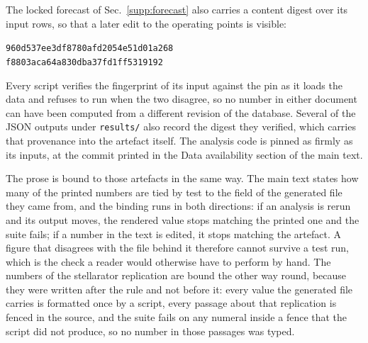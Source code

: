 \documentclass[12pt,letterpaper]{article}
\begin{document}
\noindent The locked forecast of Sec.~\ref{supp:forecast} also carries a
content digest over its input rows, so that a later edit to the operating
points is visible:
\begin{center}\scriptsize
\texttt{960d537ee3df8780afd2054e51d01a268} \\
\texttt{f8803aca64a830dba37fd1ff5319192}
\end{center}

\noindent Every script verifies the fingerprint of its input against the pin as
it loads the data and refuses to run when the two disagree, so no number in
either document can have been computed from a different revision of the
database. Several of the JSON outputs under \texttt{results/} also record the
digest they verified, which carries that provenance into the artefact itself.
The analysis code is pinned as firmly as its inputs, at the commit printed in
the Data availability section of the main text.

The prose is bound to those artefacts in the same way. The main text states how
many of the printed numbers are tied by test to the field of the generated file
they came from, and the binding runs in both directions: if an analysis is rerun
and its output moves, the rendered value stops matching the printed one and the
suite fails; if a number in the text is edited, it stops matching the artefact.
A figure that disagrees with the file behind it therefore cannot survive a test
run, which is the check a reader would otherwise have to perform by hand.
The numbers of the stellarator replication are bound the other way round,
because they were written after the rule and not before it: every value the
generated file carries is formatted once by a script, every passage about that
replication is fenced in the source, and the suite fails on any numeral inside a
fence that the script did not produce, so no number in those passages was
typed.
\end{document}
